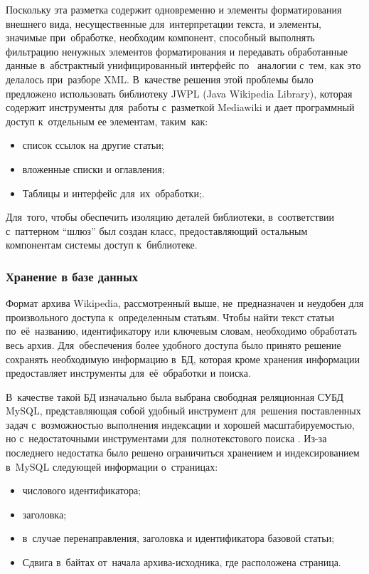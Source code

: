 Поскольку эта разметка содержит одновременно и элементы форматирования внешнего вида,
несущественные для~интерпретации текста, и элементы, значимые при~обработке,
необходим компонент, способный выполнять фильтрацию ненужных элементов форматирования
и передавать обработанные данные в~абстрактный унифицированный интерфейс 
по~ аналогии с~тем, как это делалось при~разборе XML.
В~качестве решения этой проблемы было предложено использовать библиотеку 
JWPL (Java Wikipedia Library)\cite{jwpl}, 
которая содержит инструменты для~работы с~разметкой Mediawiki\cite{wikimarkup} 
и дает программный доступ к~отдельным ее элементам, таким~как:

\begin{itemize}

\item {список ссылок на другие статьи;}
\item{вложенные списки и оглавления;}
\item{Таблицы и интерфейс для~их~обработки;.}

\end{itemize}

Для~того, чтобы обеспечить изоляцию деталей библиотеки, 
в~соответствии с~паттерном ``шлюз'' \cite{patternGateway} был создан класс, 
предоставляющий остальным компонентам системы доступ к~библиотеке.

\subsubsection{Хранение в базе данных}

Формат архива Wikipedia, рассмотренный выше, не~предназначен и неудобен для произвольного доступа к~определенным статьям. 
Чтобы найти текст статьи по~её~названию, идентификатору или ключевым словам,
необходимо обработать весь архив.
Для~обеспечения более удобного доступа было принято решение сохранять необходимую информацию в~БД,
которая кроме хранения информации предоставляет инструменты для~её~обработки и поиска.

В~качестве такой БД изначально была выбрана свободная реляционная 
СУБД MySQL, представляющая собой удобный инструмент для~решения поставленных задач 
с~возможностью выполнения индексации и хорошей масштабируемостью, 
но с~недостаточными инструментами для~полнотекстового поиска \cite{mysql}.
Из-за последнего недостатка было решено ограничиться хранением и индексированием в~MySQL следующей информации о~страницах:

\begin{itemize}

\item{числового идентификатора;}
\item {заголовка;}
\item {в~случае перенаправления, заголовка и идентификатора базовой статьи;}

\item {
Сдвига в~байтах от~начала архива-исходника, 
где расположена страница.
}

\end{itemize}

